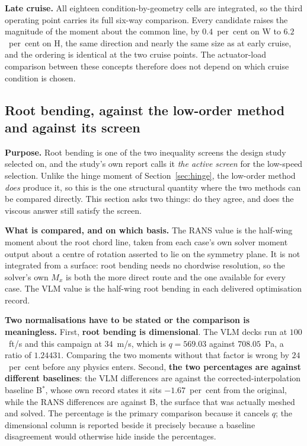 \textbf{Late cruise.} All eighteen condition-by-geometry cells are integrated, so the third
operating point carries its full six-way comparison. Every candidate raises the magnitude of the
moment about the common line, by $0.4$~per~cent on W to $6.2$~per~cent on H, the same direction
and nearly the same size as at early cruise, and the ordering is identical at the two cruise
points. The actuator-load comparison between these concepts therefore does not depend on which
cruise condition is chosen.

\subsection{Root bending, against the low-order method and against its screen}
\label{sec:rbm}
\textbf{Purpose.} Root bending is one of the two inequality screens the design study selected
on, and the study's own report calls it \emph{the active screen} for the low-speed selection.
Unlike the hinge moment of Section~\ref{sec:hinge}, the low-order method \emph{does} produce it,
so this is the one structural quantity where the two methods can be compared directly. This
section asks two things: do they agree, and does the viscous answer still satisfy the screen.

\textbf{What is compared, and on which basis.} The RANS value is the half-wing moment about the
root chord line, taken from each case's own solver moment output about a centre of rotation
asserted to lie on the symmetry plane. It is not integrated from a surface: root bending needs no
chordwise resolution, so the solver's own $M_x$ is both the more direct route and the one
available for every case. The VLM value is the half-wing root bending in each delivered
optimisation record.

\textbf{Two normalisations have to be stated or the comparison is meaningless.} First, \textbf{root
bending is dimensional}. The VLM decks run at $100$~ft/s and this campaign at $34$~m/s, which is
$q = 569.03$ against $708.05$~Pa, a ratio of $1.24431$. Comparing the two moments without that
factor is wrong by $24$~per~cent before any physics enters. Second, \textbf{the two percentages
are against different baselines}: the VLM differences are against the corrected-interpolation
baseline B$^{*}$, whose own record states it sits $-1.67$~per~cent from the original, while the
RANS differences are against B, the surface that was actually meshed and solved. The percentage
is the primary comparison because it cancels $q$; the dimensional column is reported beside it
precisely because a baseline disagreement would otherwise hide inside the percentages.

